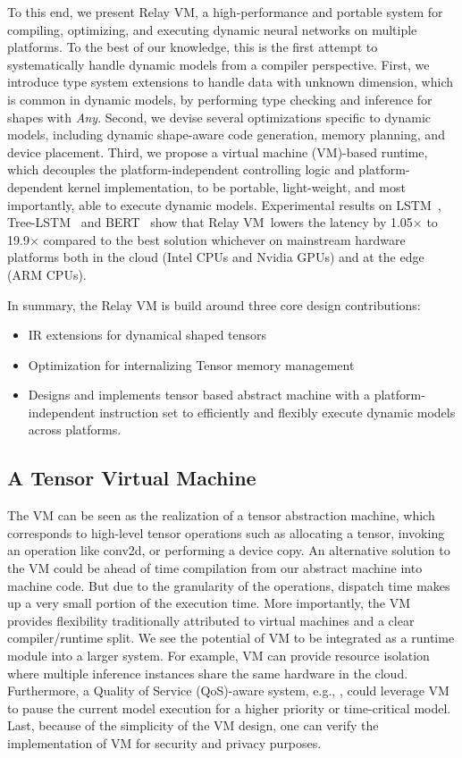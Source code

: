 To this end, we present Relay VM, a high-performance and portable system for compiling, optimizing,
  and executing dynamic neural networks on multiple platforms.
To the best of our knowledge, this is the first attempt to systematically handle dynamic models from a compiler perspective.
First, we introduce type system extensions to handle data with unknown dimension,
  which is common in dynamic models,
  by performing type checking and inference for shapes with {\em Any}.
Second, we devise several optimizations specific to dynamic models,
  including dynamic shape-aware code generation,
  memory planning, and device placement.
Third, we propose a virtual machine (VM)-based runtime,
  which decouples the platform-independent controlling logic and platform-dependent kernel implementation,
  to be portable, light-weight, and most importantly, able to execute dynamic models.
Experimental results on LSTM~\citep{lstm}, Tree-LSTM~\citep{tree_lstm} and BERT~\citep{devlin2018bert}
  show that Relay VM~lowers the latency by 1.05$\times$ to 19.9$\times$ compared to the best solution whichever
  on mainstream hardware platforms both in the cloud (Intel CPUs and Nvidia GPUs) and at the edge (ARM CPUs).

In summary, the Relay VM is build around three core design contributions:
\begin{itemize}
  \item IR extensions for dynamical shaped tensors
  \item Optimization for internalizing Tensor memory management
  \item Designs and implements tensor based abstract machine with a platform-independent instruction set to efficiently and flexibly execute dynamic models across platforms.
\end{itemize}

\subsection{A Tensor Virtual Machine}


The VM can be seen as the realization of a tensor abstraction machine, which corresponds to high-level tensor operations such as allocating a tensor, invoking an operation like conv2d, or performing a device copy.
An alternative solution to the VM could be ahead of time compilation from our abstract machine into machine code.
But due to the granularity of the operations, dispatch time makes up a very small portion of the execution time.
More importantly, the VM provides flexibility traditionally attributed to virtual machines and a clear compiler/runtime split.
We see the potential of VM to be integrated as a runtime module into a larger system.
For example, VM can provide resource isolation where multiple inference instances share the same hardware in the cloud.
Furthermore, a Quality of Service (QoS)-aware system, e.g., \citep{kang2018hotmobile, Yachir2009rsj}, could leverage VM to pause the
current model execution for a higher priority or time-critical model. Last, because of the simplicity of the VM design, one can verify the implementation of VM for security and privacy purposes.

